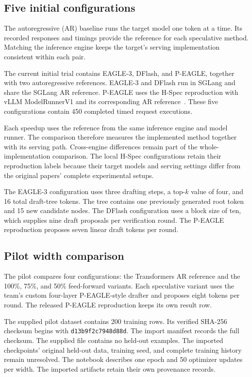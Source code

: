 \documentclass[conference,onecolumn]{IEEEtran}
\begin{document}
\subsection{Five initial configurations}
The autoregressive (AR) baseline runs the target model one token at a time. Its recorded responses and timings provide the reference for each speculative method. Matching the inference engine keeps the target's serving implementation consistent within each pair.

The current initial trial contains EAGLE-3, DFlash, and P-EAGLE, together with two autoregressive references. EAGLE-3 and DFlash run in SGLang and share the SGLang AR reference. P-EAGLE uses the H-Spec reproduction with vLLM ModelRunnerV1 and its corresponding AR reference~\cite{hspec}. These five configurations contain 450 completed timed request executions.

Each speedup uses the reference from the same inference engine and model runner. The comparison therefore measures the implemented method together with its serving path. Cross-engine differences remain part of the whole-implementation comparison. The local H-Spec configurations retain their reproduction labels because their target models and serving settings differ from the original papers' complete experimental setups.

The EAGLE-3 configuration uses three drafting steps, a top-$k$ value of four, and 16 total draft-tree tokens. The tree contains one previously generated root token and 15 new candidate nodes. The DFlash configuration uses a block size of ten, which supplies nine draft proposals per verification round. The P-EAGLE reproduction proposes seven linear draft tokens per round.

\subsection{Pilot width comparison}
The pilot compares four configurations: the Transformers AR reference and the 100\%, 75\%, and 50\% feed-forward variants. Each speculative variant uses the team's custom four-layer P-EAGLE-style drafter and proposes eight tokens per round. The released P-EAGLE reproduction keeps its own result row.

The supplied pilot dataset contains 200 training rows. Its verified SHA-256 checksum begins with \texttt{d13b9f2c7948d88d}. The import manifest records the full checksum. The supplied file contains no held-out examples. The imported checkpoints' original held-out data, training seed, and complete training history remain unresolved. The notebook describes one epoch and 50 optimizer updates per width. The imported artifacts retain their own provenance records.
\end{document}
